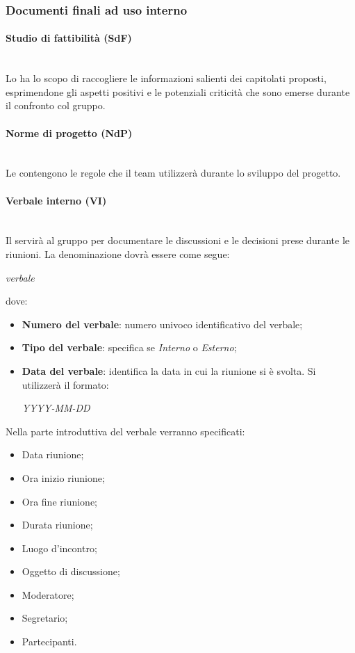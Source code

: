 \subsubsection{Documenti finali ad uso interno}
	\paragraph{Studio di fattibilità (SdF)}
	~\\Lo \SdF{} ha lo scopo di raccogliere le informazioni salienti dei capitolati proposti, esprimendone gli aspetti positivi e 
	le potenziali criticità che sono emerse durante il confronto col gruppo.
	\paragraph{Norme di progetto (NdP)}
	~\\Le \NdP{} contengono le regole che il team utilizzerà durante lo sviluppo del progetto.
	\paragraph{Verbale interno (VI)}
	~\\Il \VI{} servirà al gruppo per documentare le discussioni e le decisioni prese durante le riunioni. 
	La denominazione dovrà essere come segue:\\
	\begin{center}
		\textit{verbale} 
	\end{center}
	dove:
	\begin{itemize}
		\item \textbf{Numero del verbale}:
		numero univoco identificativo del verbale;
		\item \textbf{Tipo del verbale}:
		specifica se \emph{Interno} o \emph{Esterno};
		\item \textbf{Data del verbale}:
		identifica la data in cui la riunione si è svolta. Si utilizzerà il formato:
		\begin{center}
			\emph{YYYY-MM-DD}
		\end{center}
	\end{itemize}
	Nella parte introduttiva del verbale verranno specificati:
	\begin{itemize}
		\item Data riunione;
		\item Ora inizio riunione;
		\item Ora fine riunione;
		\item Durata riunione;
		\item Luogo d'incontro;
		\item Oggetto di discussione;
		\item Moderatore;
		\item Segretario;
		\item Partecipanti.
	\end{itemize}
